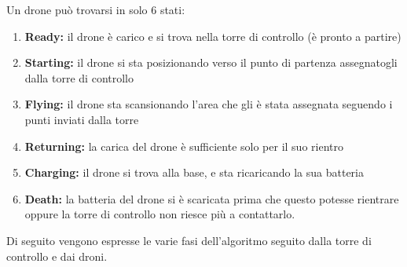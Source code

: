 \documentclass[a4paper, 12pt]{report}
\begin{document}
Un drone può trovarsi in solo $6$ stati:
\begin{enumerate}
    \item \textbf{Ready:} il drone è carico e si trova nella torre di controllo (è pronto a partire)
    \item \textbf{Starting:} il drone si sta posizionando verso il punto di partenza assegnatogli dalla torre di controllo
    \item \textbf{Flying:} il drone sta scansionando l'area che gli è stata assegnata seguendo i punti inviati dalla torre
    \item \textbf{Returning:} la carica del drone è sufficiente solo per il suo rientro 
    \item \textbf{Charging:} il drone si trova alla base, e sta ricaricando la sua batteria
    \item \textbf{Death:} la batteria del drone si è scaricata prima che questo potesse rientrare oppure la torre di controllo non riesce più a contattarlo.
\end{enumerate}
Di seguito vengono espresse le varie fasi dell'algoritmo seguito dalla torre di controllo e dai droni.
\end{document}

